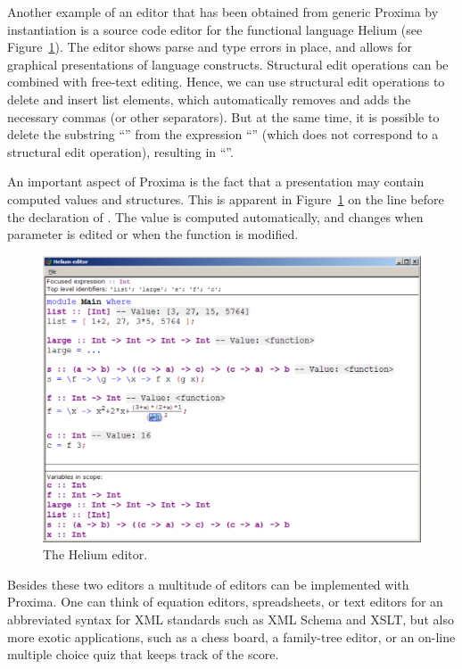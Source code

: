 \documentclass[10pt]{article}
\begin{document}
Another example of an editor that has been obtained from generic Proxima by instantiation is a source code editor for the functional language Helium (see Figure~\ref{fig:heliumEditor}). The editor shows parse and type errors in place, and allows for graphical presentations of language constructs. Structural edit operations can be combined with free-text editing. Hence, we can use structural edit operations to delete and insert list elements, which automatically removes and adds the necessary commas (or other separators). But at the same time, it is possible to delete the substring ``'' from the expression ``\p{[ 1+2, 3]}'' (which does not correspond to a structural edit operation), resulting in ``\p{[ 13 ]}''.


An important aspect of Proxima is the fact that a presentation may contain computed values and structures. This is apparent in Figure~\ref{fig:heliumEditor} on the line before the declaration of . The value  is computed automatically, and changes when parameter  is edited or when the function  is modified.

\begin{figure}
\begin{center}
\includegraphics[width=12cm]{images/heliumMainWindow}
\end{center}
\caption{The Helium editor.}
\label{fig:heliumEditor}
\end{figure}

Besides these two editors a multitude of editors can be implemented with Proxima. One can think of equation editors, spreadsheets, or text editors for an abbreviated syntax for XML standards such as XML Schema and XSLT, but also more exotic applications, such as a chess board, a family-tree editor, or an on-line multiple choice quiz that keeps track of the score.
\end{document}

